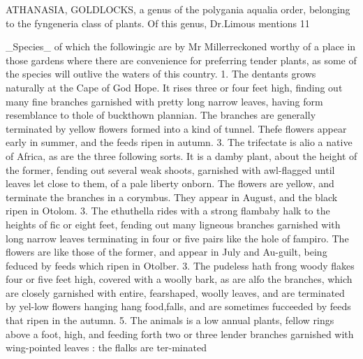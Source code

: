 ATHANASIA, GOLDLOCKS, a genus of the polygania aqualia order, belonging to the fyngeneria class of plants. Of this genus, Dr.Limous mentions 11\par\medskip
\_Species\_ of which the followingic are by Mr Millerreckoned worthy of a place in those gardens where there are convenience for preferring tender plants, as some of the species will outlive the waters of this country. 1. The dentants grows naturally at the Cape of God Hope. It rises three or four feet high, finding out many fine branches garnished with pretty long narrow leaves, having form resemblance to thole of buckthown plannian. The branches are generally terminated by yellow flowers formed into a kind of tunnel. Thefe flowers appear early in summer, and the feeds ripen in autumn. 3. The trifectate is alio a native of Africa, as are the three following sorts. It is a damby plant, about the height of the former, fending out several weak shoots, garnished with awl-flagged until leaves let close to them, of a pale liberty onborn. The flowers are yellow, and terminate the branches in a corymbus. They appear in August, and the black ripen in Otolom. 3. The ethuthella rides with a strong flambaby halk to the heights of fic or eight feet, fending out many ligneous branches garnished with long narrow leaves terminating in four or five pairs like the hole of fampiro. The flowers are like those of the former, and appear in July and Au-guilt, being feduced by feeds which ripen in Otolber. 3. The pudeless hath frong woody flakes four or five feet high, covered with a woolly bark, as are alfo the branches, which are closely garnished with entire, fearshaped, woolly leaves, and are terminated by yel-low flowers hanging hang food,falls, and are sometimes fucceeded by feeds that ripen in the autumn. 5. The animals is a low annual plants, fellow rings above a foot, high, and feeding forth two or three lender branches garnished with wing-pointed leaves : the flalks are ter-minated\par\medskip
